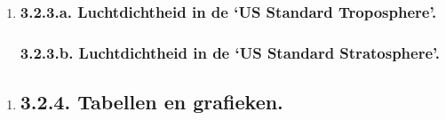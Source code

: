 \documentclass[]{article}
\begin{document}
\begin{enumerate}
\item
  \subsubsection{}\label{section-6}

  \subsubsection{3.2.3.a. Luchtdichtheid in de `US Standard
  Troposphere'.}\label{a.-luchtdichtheid-in-de-us-standard-troposphere.}

  \subsubsection{}\label{section-7}

  \subsubsection{3.2.3.b. Luchtdichtheid in de `US Standard
  Stratosphere'.}\label{b.-luchtdichtheid-in-de-us-standard-stratosphere.}

  \subsubsection{}\label{section-8}

  \subsubsection{ }\label{section-9}

  \subsubsection{}\label{section-10}

  \subsubsection{}\label{section-11}
\end{enumerate}

\begin{enumerate}
\item
  \subsection{3.2.4. Tabellen en
  grafieken.}\label{tabellen-en-grafieken.}
\end{enumerate}
\end{document}
